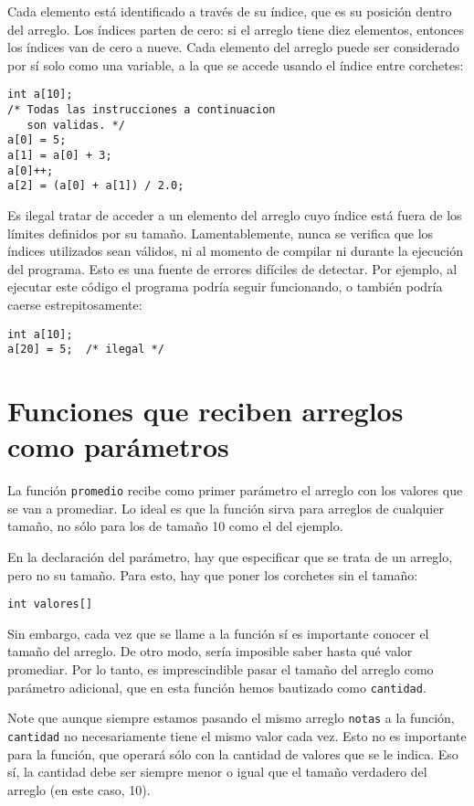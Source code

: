 Cada elemento está identificado a través de su índice, que es su
posición dentro del arreglo. Los índices parten de cero: si el arreglo
tiene diez elementos, entonces los índices van de cero a nueve. Cada
elemento del arreglo puede ser considerado por sí solo como una
variable, a la que se accede usando el índice entre corchetes:

\begin{lstlisting}
int a[10];
/* Todas las instrucciones a continuacion
   son validas. */
a[0] = 5;
a[1] = a[0] + 3;
a[0]++;
a[2] = (a[0] + a[1]) / 2.0;
\end{lstlisting}

Es ilegal tratar de acceder a un elemento del arreglo cuyo índice está
fuera de los límites definidos por su tamaño. Lamentablemente, nunca se
verifica que los índices utilizados sean válidos, ni al momento de
compilar ni durante la ejecución del programa. Esto es una fuente de
errores difíciles de detectar. Por ejemplo, al ejecutar este código el
programa podría seguir funcionando, o también podría caerse
estrepitosamente:

\begin{lstlisting}
int a[10];
a[20] = 5;  /* ilegal */
\end{lstlisting}

\section{Funciones que reciben arreglos como parámetros}

La función \lstinline!promedio! recibe como primer parámetro el arreglo
con los valores que se van a promediar. Lo ideal es que la función sirva
para arreglos de cualquier tamaño, no sólo para los de tamaño 10 como el
del ejemplo.

En la declaración del parámetro, hay que especificar que se trata de un
arreglo, pero no su tamaño. Para esto, hay que poner los corchetes sin
el tamaño:

\begin{lstlisting}
int valores[]
\end{lstlisting}

Sin embargo, cada vez que se llame a la función sí es importante conocer
el tamaño del arreglo. De otro modo, sería imposible saber hasta qué
valor promediar. Por lo tanto, es imprescindible pasar el tamaño del
arreglo como parámetro adicional, que en esta función hemos bautizado
como \lstinline!cantidad!.

Note que aunque siempre estamos pasando el mismo arreglo
\lstinline!notas! a la función, \lstinline!cantidad! no necesariamente
tiene el mismo valor cada vez. Esto no es importante para la función,
que operará sólo con la cantidad de valores que se le indica. Eso sí, la
cantidad debe ser siempre menor o igual que el tamaño verdadero del
arreglo (en este caso, 10).

